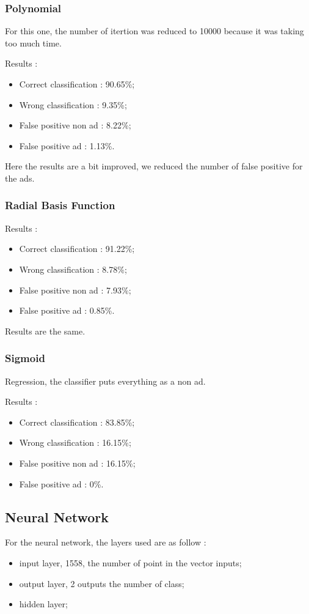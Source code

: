 \subsubsection{Polynomial}

For this one, the number of itertion was reduced to 10000 because it was taking too much time.

Results :
\begin{itemize}
  \item Correct classification : 90.65\%;
  \item Wrong classification : 9.35\%;
  \item False positive non ad : 8.22\%;
  \item False positive ad : 1.13\%.
\end{itemize}

Here the results are a bit improved, we reduced the number of false positive for the ads.
\subsubsection{Radial Basis Function}

Results :
\begin{itemize}
  \item Correct classification : 91.22\%;
  \item Wrong classification : 8.78\%;
  \item False positive non ad : 7.93\%;
  \item False positive ad : 0.85\%.
\end{itemize}

Results are the same.
\subsubsection{Sigmoid}

Regression, the classifier puts everything as a non ad.

Results :
\begin{itemize}
  \item Correct classification : 83.85\%;
  \item Wrong classification : 16.15\%;
  \item False positive non ad : 16.15\%;
  \item False positive ad : 0\%.
\end{itemize}

\subsection{Neural Network}
For the neural network, the layers used are as follow :
  \begin{itemize}
    \item input layer, 1558, the number of point in the vector inputs;
    \item output layer, 2 outputs the number of class;
    \item hidden layer;
  \end{itemize}

